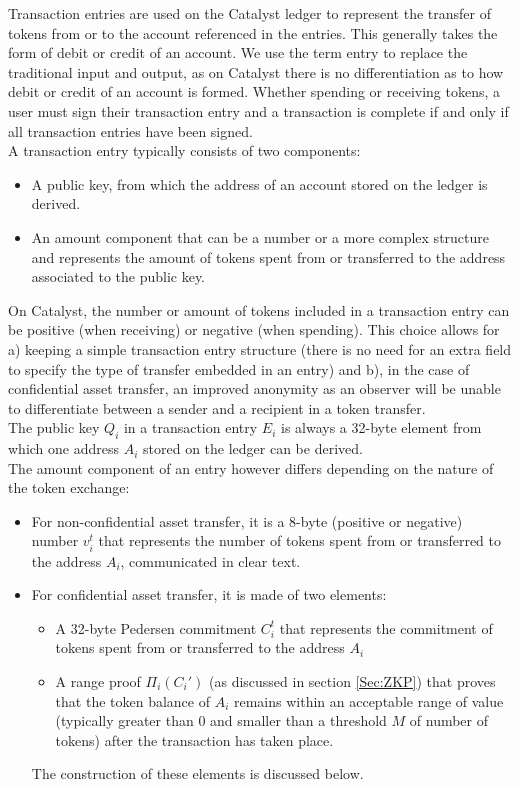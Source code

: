 Transaction entries are used on the Catalyst ledger to represent the transfer of tokens from or to the account referenced in the entries. This generally takes the form of debit or credit of an account. We use the term entry to replace the traditional input and output, as on Catalyst there is no differentiation as to how debit or credit of an account is formed. Whether spending or receiving tokens, a user must sign their transaction entry and a transaction is complete if and only if all transaction entries have been signed.\\

 A transaction entry typically consists of two components: 
 \begin{itemize}
\item A public key, from which the address of an account stored on the ledger is derived.
\item An amount component that can be a number or a more complex structure and represents the amount of tokens spent from or transferred to the address associated to the public key.
\end{itemize}
On Catalyst, the number  or amount of tokens included in a transaction entry can be positive (when receiving) or negative (when spending). This  choice allows for a) keeping a simple transaction entry structure (there is no need for an extra field to specify the type of transfer embedded in an entry) and b), in the case of confidential asset transfer, an improved anonymity as an observer will be unable to differentiate between a sender and a recipient in a token transfer. \\

The public key $Q_i$ in a transaction entry $E_i$ is always a 32-byte element from which one address $A_i$ stored on the ledger can be derived. \\

The amount component of an entry however differs depending on the nature of the token exchange:

\begin{itemize}
\item For non-confidential asset transfer, it is a 8-byte (positive or negative) number $v^t_i$ that represents the number of tokens spent from or transferred to the address $A_i$, communicated in clear text.
\item For confidential asset transfer, it is made of two elements: 
\begin{itemize}
\item A 32-byte Pedersen commitment $C_{i}^{t}$ that represents the commitment of tokens spent from or transferred to the address $A_i$ 
\item A range proof $\Pi_i(C_{i}')$ (as discussed in section \ref{Sec:ZKP}) that proves that the token balance of $A_i$ remains within an acceptable range of value (typically greater than 0 and smaller than a threshold $M$ of number of tokens) after the transaction has taken place.
\end{itemize}
 The construction of these elements is discussed below. 
\end{itemize}

